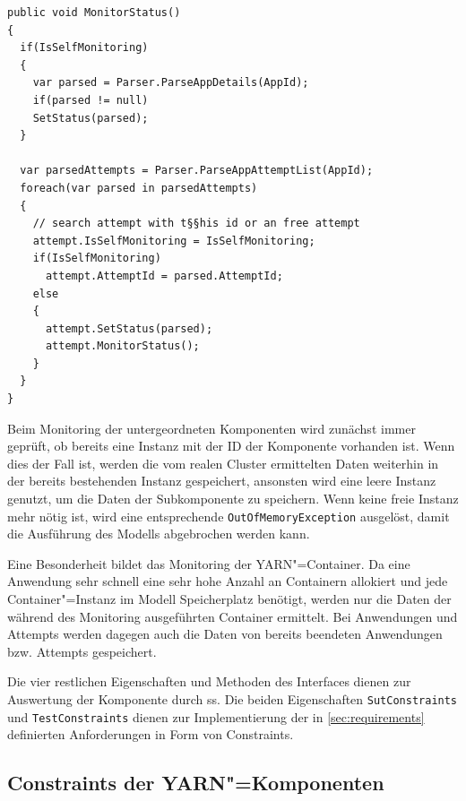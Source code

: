 \begin{lstlisting}[label=lst:monitorAppStatus,style=cs,
caption={[Implementierung der Methode MonitorStatus() in der Klasse YarnApp]
    Implementierung der Methode \texttt{MonitorStatus()} in der Klasse \texttt{YarnApp} (gekürzt).
    Das Monitoring der anderen Komponenten erfolgt analog hierzu.}]
public void MonitorStatus()
{
  if(IsSelfMonitoring)
  {
    var parsed = Parser.ParseAppDetails(AppId);
    if(parsed != null)
    SetStatus(parsed);
  }
  
  var parsedAttempts = Parser.ParseAppAttemptList(AppId);
  foreach(var parsed in parsedAttempts)
  {
    // search attempt with t§§his id or an free attempt
    attempt.IsSelfMonitoring = IsSelfMonitoring;
    if(IsSelfMonitoring)
      attempt.AttemptId = parsed.AttemptId;
    else
    {
      attempt.SetStatus(parsed);
      attempt.MonitorStatus();
    }
  }
}
\end{lstlisting}

Beim Monitoring der untergeordneten Komponenten wird zunächst immer geprüft, ob bereits eine Instanz mit der ID der Komponente vorhanden ist.
Wenn dies der Fall ist, werden die vom realen Cluster ermittelten Daten weiterhin in der bereits bestehenden Instanz gespeichert, ansonsten wird eine leere Instanz genutzt, um die Daten der Subkomponente zu speichern.
Wenn keine freie Instanz mehr nötig ist, wird eine entsprechende \texttt{OutOfMemoryException} ausgelöst, damit die Ausführung des Modells abgebrochen werden kann.

Eine Besonderheit bildet das Monitoring der YARN"=Container.
Da eine Anwendung sehr schnell eine sehr hohe Anzahl an Containern allokiert und jede Container"=Instanz im Modell Speicherplatz benötigt, werden nur die Daten der während des Monitoring ausgeführten Container ermittelt.
Bei Anwendungen und Attempts werden dagegen auch die Daten von bereits beendeten Anwendungen bzw. Attempts gespeichert.

Die vier restlichen Eigenschaften und Methoden des Interfaces dienen zur Auswertung der Komponente durch \gls{ss}.
Die beiden Eigenschaften \texttt{SutConstraints} und \texttt{TestConstraints} dienen zur Implementierung der in \cref{sec:requirements} definierten Anforderungen in Form von Constraints.

\subsection{Constraints der YARN"=Komponenten}
\label{subsec:yarnComponentConstraints}

